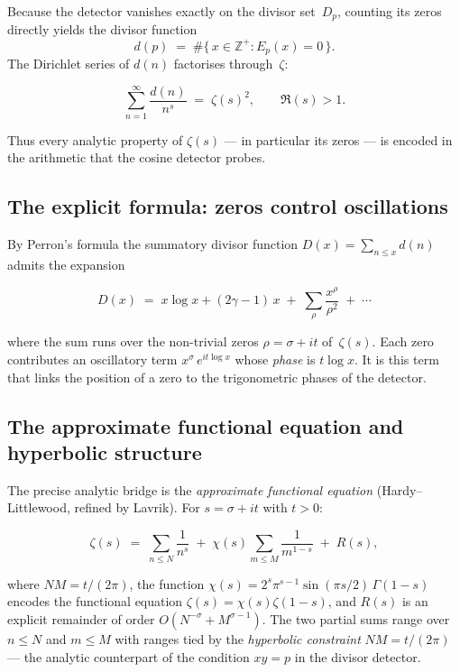 \documentclass[12pt,a4paper]{article}
\newcommand{\ZZ}{\mathbb{Z}}
\begin{document}
Because the detector vanishes exactly on the divisor set~$D_p$, counting its zeros directly yields the divisor function
\[
d(p) \;=\; \#\{\, x\in\ZZ^+ : E_p(x) = 0 \,\}.
\]
The Dirichlet series of $d(n)$ factorises through~$\zeta$:

\begin{mathblock}
\[
\sum_{n=1}^{\infty} \frac{d(n)}{n^s} \;=\; \zeta(s)^2, \qquad \Re(s)>1.
\]
\end{mathblock}

\noindent Thus every analytic property of $\zeta(s)$ --- in particular its zeros --- is encoded in the arithmetic that the cosine detector probes.

\subsection{The explicit formula: zeros control oscillations}

By Perron's formula the summatory divisor function $D(x) = \sum_{n\le x} d(n)$ admits the expansion

\begin{mathblock}
\[
D(x) \;=\; x\log x + (2\gamma-1)\,x \;+\; \sum_{\rho}\frac{x^{\rho}}{\rho^2} \;+\; \cdots
\]
\end{mathblock}

\noindent where the sum runs over the non-trivial zeros $\rho = \sigma + it$ of~$\zeta(s)$. Each zero contributes an oscillatory term $x^{\sigma}\,e^{it\log x}$ whose \emph{phase} is $t\log x$. It is this term that links the position of a zero to the trigonometric phases of the detector.

\subsection{The approximate functional equation and hyperbolic structure}

The precise analytic bridge is the \emph{approximate functional equation} (Hardy--Littlewood, refined by Lavrik). For $s = \sigma + it$ with $t > 0$:

\begin{mathblock}
\[
\zeta(s) \;=\; \sum_{n \le N} \frac{1}{n^{s}} \;+\; \chi(s)\sum_{m \le M} \frac{1}{m^{1-s}} \;+\; R(s),
\]
\end{mathblock}

\noindent where $NM = t/(2\pi)$, the function $\chi(s) = 2^s\pi^{s-1}\sin(\pi s/2)\,\Gamma(1-s)$ encodes the functional equation $\zeta(s)=\chi(s)\zeta(1-s)$, and $R(s)$ is an explicit remainder of order $O(N^{-\sigma} + M^{\sigma-1})$. The two partial sums range over $n \le N$ and $m \le M$ with ranges tied by the \emph{hyperbolic constraint} $NM = t/(2\pi)$ --- the analytic counterpart of the condition $xy = p$ in the divisor detector.
\end{document}
